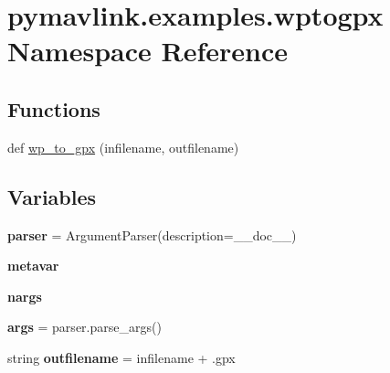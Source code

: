 \hypertarget{namespacepymavlink_1_1examples_1_1wptogpx}{}\section{pymavlink.\+examples.\+wptogpx Namespace Reference}
\label{namespacepymavlink_1_1examples_1_1wptogpx}
\subsection*{Functions}
\begin{DoxyCompactItemize}
\item 
def \hyperlink{namespacepymavlink_1_1examples_1_1wptogpx_a1e2a92ba9dc9c4b0facc6734a2b8baa3}{wp\+\_\+to\+\_\+gpx} (infilename, outfilename)
\end{DoxyCompactItemize}
\subsection*{Variables}
\begin{DoxyCompactItemize}
\item 
\mbox{\label{namespacepymavlink_1_1examples_1_1wptogpx_aa1800996bbadaa4ce742a88d9c7b9c38}} 
{\bfseries parser} = Argument\+Parser(description=\+\_\+\+\_\+doc\+\_\+\+\_\+)
\item 
\mbox{\label{namespacepymavlink_1_1examples_1_1wptogpx_a7b1acf0b2ee3b73eb9364fc241d62de9}} 
{\bfseries metavar}
\item 
\mbox{\label{namespacepymavlink_1_1examples_1_1wptogpx_a18e53d182196efcc641b9a08e31e5515}} 
{\bfseries nargs}
\item 
\mbox{\label{namespacepymavlink_1_1examples_1_1wptogpx_a7758427a51641f17350ed66c2a9948dc}} 
{\bfseries args} = parser.\+parse\+\_\+args()
\item 
\mbox{\label{namespacepymavlink_1_1examples_1_1wptogpx_a88358ed94e434e7d6a7b835f2c5ccf70}} 
string {\bfseries outfilename} = infilename + \textquotesingle{}.gpx\textquotesingle{}
\end{DoxyCompactItemize}


